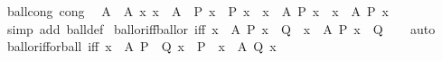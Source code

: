 \begin{isabellebody}
\isanewline
{}\isamarkupfalse%
\ ball{\isacharunderscore}{\kern0pt}cong\ {\isacharbrackleft}{\kern0pt}cong{\isacharbrackright}{\kern0pt}{\isacharcolon}{\kern0pt}\isanewline
\ \ {\isachardoublequoteopen}{\isasymlbrakk}A\ {\isacharequal}{\kern0pt}\ A{\isacharprime}{\kern0pt}{\isacharsemicolon}{\kern0pt}\ {\isasymAnd}x{\isachardot}{\kern0pt}\ x\ {\isasymin}\ A{\isacharprime}{\kern0pt}\ {\isasymLongrightarrow}\ P\ x\ {\isasymlongleftrightarrow}\ P{\isacharprime}{\kern0pt}\ x{\isasymrbrakk}\ {\isasymLongrightarrow}\ {\isacharparenleft}{\kern0pt}{\isasymforall}x\ {\isasymin}\ A{\isachardot}{\kern0pt}\ P\ x{\isacharparenright}{\kern0pt}\ {\isasymlongleftrightarrow}\ {\isacharparenleft}{\kern0pt}{\isasymforall}x\ {\isasymin}\ A{\isacharprime}{\kern0pt}{\isachardot}{\kern0pt}\ P{\isacharprime}{\kern0pt}\ x{\isacharparenright}{\kern0pt}{\isachardoublequoteclose}\isanewline
%
\isadelimproof
\ \ %
\endisadelimproof
%
\isatagproof
{}\isamarkupfalse%
\ {\isacharparenleft}{\kern0pt}simp\ add{\isacharcolon}{\kern0pt}\ ball{\isacharunderscore}{\kern0pt}def{\isacharparenright}{\kern0pt}%
\endisatagproof
{\isafoldproof}%
%
\isadelimproof
\isanewline
%
\endisadelimproof
\isanewline
{}\isamarkupfalse%
\ ball{\isacharunderscore}{\kern0pt}or{\isacharunderscore}{\kern0pt}iff{\isacharunderscore}{\kern0pt}ball{\isacharunderscore}{\kern0pt}or\ {\isacharbrackleft}{\kern0pt}iff{\isacharbrackright}{\kern0pt}{\isacharcolon}{\kern0pt}\ {\isachardoublequoteopen}{\isacharparenleft}{\kern0pt}{\isasymforall}x\ {\isasymin}\ A{\isachardot}{\kern0pt}\ P\ x\ {\isasymor}\ Q{\isacharparenright}{\kern0pt}\ {\isasymlongleftrightarrow}\ {\isacharparenleft}{\kern0pt}{\isacharparenleft}{\kern0pt}{\isasymforall}x\ {\isasymin}\ A{\isachardot}{\kern0pt}\ P\ x{\isacharparenright}{\kern0pt}\ {\isasymor}\ Q{\isacharparenright}{\kern0pt}{\isachardoublequoteclose}\isanewline
%
\isadelimproof
\ \ %
\endisadelimproof
%
\isatagproof
{}\isamarkupfalse%
\ auto%
\endisatagproof
{\isafoldproof}%
%
\isadelimproof
\isanewline
%
\endisadelimproof
\isanewline
{}\isamarkupfalse%
\ ball{\isacharunderscore}{\kern0pt}or{\isacharunderscore}{\kern0pt}iff{\isacharunderscore}{\kern0pt}or{\isacharunderscore}{\kern0pt}ball\ {\isacharbrackleft}{\kern0pt}iff{\isacharbrackright}{\kern0pt}{\isacharcolon}{\kern0pt}\ {\isachardoublequoteopen}{\isacharparenleft}{\kern0pt}{\isasymforall}x\ {\isasymin}\ A{\isachardot}{\kern0pt}\ P\ {\isasymor}\ Q\ x{\isacharparenright}{\kern0pt}\ {\isasymlongleftrightarrow}\ {\isacharparenleft}{\kern0pt}P\ {\isasymor}\ {\isacharparenleft}{\kern0pt}{\isasymforall}x\ {\isasymin}\ A{\isachardot}{\kern0pt}\ Q\ x{\isacharparenright}{\kern0pt}{\isacharparenright}{\kern0pt}{\isachardoublequoteclose}\isanewline

\end{isabellebody}
